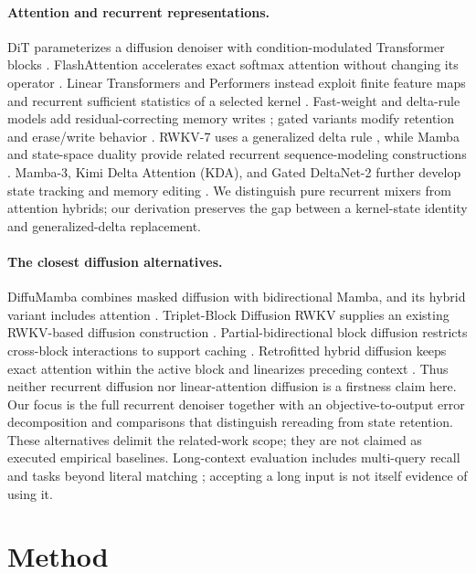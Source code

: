 \documentclass{article}
\theoremstyle{remark}\newtheorem{remark}[theorem]{Remark}
\begin{document}
\paragraph{Attention and recurrent representations.}
DiT parameterizes a diffusion denoiser with condition-modulated Transformer blocks \citep{transformer,dit}. FlashAttention accelerates exact softmax attention without changing its operator \citep{flashattention}. Linear Transformers and Performers instead exploit finite feature maps and recurrent sufficient statistics of a selected kernel \citep{lineartransformer,performer}. Fast-weight and delta-rule models add residual-correcting memory writes \citep{fastweights,deltanet}; gated variants modify retention and erase/write behavior \citep{gla,gateddelta,gateddelta2}. RWKV-7 uses a generalized delta rule \citep{rwkv7}, while Mamba and state-space duality provide related recurrent sequence-modeling constructions \citep{mamba,mamba2}. Mamba-3, Kimi Delta Attention (KDA), and Gated DeltaNet-2 further develop state tracking and memory editing \citep{mamba3,kimi,gateddelta2}. We distinguish pure recurrent mixers from attention hybrids; our derivation preserves the gap between a kernel-state identity and generalized-delta replacement.

\paragraph{The closest diffusion alternatives.}
DiffuMamba combines masked diffusion with bidirectional Mamba, and its hybrid variant includes attention \citep{diffumamba}. Triplet-Block Diffusion RWKV supplies an existing RWKV-based diffusion construction \citep{triplet}. Partial-bidirectional block diffusion restricts cross-block interactions to support caching \citep{partial}. Retrofitted hybrid diffusion keeps exact attention within the active block and linearizes preceding context \citep{retrofit}. Thus neither recurrent diffusion nor linear-attention diffusion is a firstness claim here. Our focus is the full recurrent denoiser together with an objective-to-output error decomposition and comparisons that distinguish rereading from state retention. These alternatives delimit the related-work scope; they are not claimed as executed empirical baselines. Long-context evaluation includes multi-query recall \citep{zoology} and tasks beyond literal matching \citep{nolima}; accepting a long input is not itself evidence of using it.

\section{Method}
\label{m:method}
\end{document}
